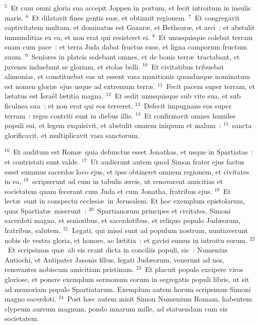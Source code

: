 ${}^{5}$~Et cum omni gloria sua accepit Joppen in portum, et fecit introitum in insulis maris.
${}^{6}$~Et dilatavit fines gentis su\ae , et obtinuit regionem.
${}^{7}$~Et congregavit captivitatem multam, et dominatus est Gazar\ae , et Bethsur\ae , et arci~: et abstulit immunditias ex ea, et non erat qui resisteret ei.
${}^{8}$~Et unusquisque colebat terram suam cum pace~: et terra Juda dabat fructus suos, et ligna camporum fructum suum.
${}^{9}$~Seniores in plateis sedebant omnes, et de bonis terr\ae\ tractabant, et juvenes induebant se gloriam, et stolas belli.
${}^{10}$~Et civitatibus tribuebat alimonias, et constituebat eas ut essent vasa munitionis quoadusque nominatum est nomen glori\ae\ ejus usque ad extremum terr\ae .
${}^{11}$~Fecit pacem super terram, et l\ae tatus est Isra\"el l\ae titia magna.
${}^{12}$~Et sedit unusquisque sub vite sua, et sub ficulnea sua~: et non erat qui eos terreret.
${}^{13}$~Defecit impugnans eos super terram~: reges contriti sunt in diebus illis.
${}^{14}$~Et confirmavit omnes humiles populi sui, et legem exquisivit, et abstulit omnem iniquum et malum~:
${}^{15}$~sancta glorificavit, et multiplicavit vasa sanctorum.


${}^{16}$~Et auditum est Rom\ae\ quia defunctus esset Jonathas, et usque in Spartiatas~: et contristati sunt valde.
${}^{17}$~Ut audierunt autem quod Simon frater ejus factus esset summus sacerdos loco ejus, et ipse obtineret omnem regionem, et civitates in ea,
${}^{18}$~scripserunt ad eum in tabulis \ae reis, ut renovarent amicitias et societatem quam fecerant cum Juda et cum Jonatha, fratribus ejus.
${}^{19}$~Et lect\ae\ sunt in conspectu ecclesi\ae\ in Jerusalem. Et hoc exemplum epistolarum, quas Spartiat\ae\ miserunt~:
${}^{20}$~Spartianorum principes et civitates, Simoni sacerdoti magno, et senioribus, et sacerdotibus, et reliquo populo Jud\ae orum, fratribus, salutem.
${}^{21}$~Legati, qui missi sunt ad populum nostrum, nuntiaverunt nobis de vestra gloria, et honore, ac l\ae titia~: et gavisi sumus in introitu eorum.
${}^{22}$~Et scripsimus qu\ae\ ab eis erant dicta in conciliis populi, sic~: Numenius Antiochi, et Antipater Jasonis filius, legati Jud\ae orum, venerunt ad nos, renovantes nobiscum amicitiam pristinam.
${}^{23}$~Et placuit populo excipere viros gloriose, et ponere exemplum sermonum eorum in segregatis populi libris, ut sit ad memoriam populo Spartiatarum. Exemplum autem horum scripsimus Simoni magno sacerdoti.
${}^{24}$~Post h\ae c autem misit Simon Numenium Romam, habentem clypeum aureum magnum, pondo mnarum mille, ad statuendam cum eis societatem.

